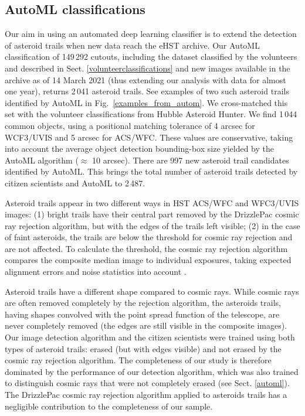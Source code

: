 \documentclass{aa}
\begin{document}
\subsection{AutoML classifications}
\label{AutoML_classifications}

Our aim in using an automated deep learning classifier is to extend the detection of asteroid trails when new data reach the eHST archive. Our AutoML classification of 149\,292 cutouts, including the dataset classified by the volunteers and described in Sect. \ref{volunteerclassifications} and new images available in the archive as of 14 March 2021 (thus extending our analysis with data for almost one year), returns 2\,041 asteroid trails.
See examples of two such asteroid trails identified by AutoML in Fig.~\ref{examples_from_autom}. We cross-matched this set with the volunteer classifications from Hubble Asteroid Hunter. We find 1\,044 common objects, using a positional matching tolerance of 4 arcsec for WCF3/UVIS and 5 arcsec for ACS/WFC. These values are conservative, taking into account the average object detection bounding-box size yielded by the AutoML algorithm ($\approx$ 10 arcsec). There are 997 new asteroid trail candidates identified by AutoML. This brings the total number of asteroid trails detected by citizen scientists and AutoML to 2\,487.  

Asteroid trails appear in two different ways in HST ACS/WFC and WFC3/UVIS images: (1) bright trails have their central part removed by the DrizzlePac cosmic ray rejection algorithm, but with the edges of the trails left visible; (2) in the case of faint asteroids, the trails are below the threshold for cosmic ray rejection and are not affected. To calculate the threshold, the cosmic ray rejection algorithm compares the composite median image to individual exposures, taking expected alignment errors and noise statistics into account \citep{Gonzaga2012}.

Asteroid trails have a different shape compared to cosmic rays. While cosmic rays are often removed completely by the rejection algorithm, the asteroids trails, having shapes convolved with the point spread function of the telescope, are never completely removed (the edges are still visible in the composite images). Our image detection algorithm and the citizen scientists were trained using both types of asteroid trails: erased (but with edges visible) and not erased by the cosmic ray rejection algorithm. The completeness of our study is therefore dominated by the performance of our detection algorithm, which was also trained to distinguish cosmic rays that were not completely erased (see Sect. \ref{automl}). The DrizzlePac cosmic ray rejection algorithm applied to asteroids trails has a negligible contribution to the completeness of our sample.
\end{document}

